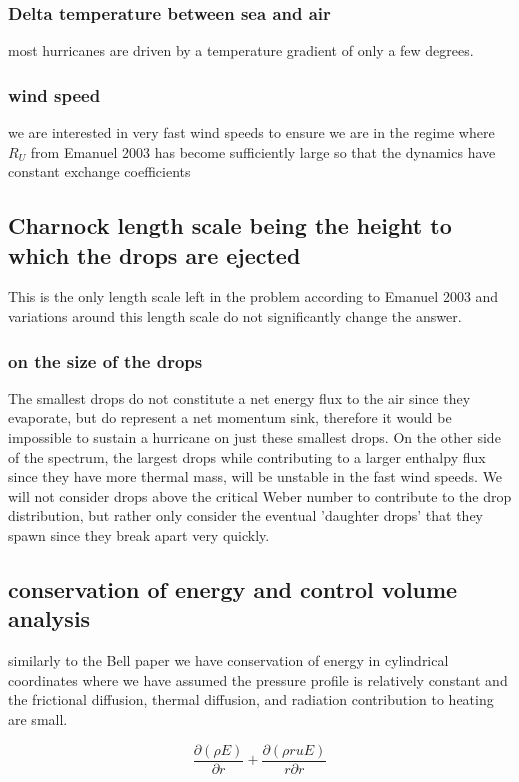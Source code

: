 \documentclass[10pt,a4paper]{article}
\begin{document}
\subsubsection{Delta temperature between sea and air}
most hurricanes are driven by a temperature gradient of only a few degrees. 
\subsubsection{wind speed}
we are interested in very fast wind speeds to ensure we are in the regime where $R_U$ from Emanuel 2003 has become sufficiently large so that the dynamics have constant exchange coefficients 
\subsection{Charnock length scale being the height to which the drops are ejected}
This is the only length scale left in the problem according to Emanuel 2003 and variations around this length scale do not significantly change the answer.


\subsubsection{on the size of the drops}
The smallest drops do not constitute a net energy flux to the air since they evaporate, but do represent a net momentum sink, therefore it would be impossible to sustain a hurricane on just these smallest drops. On the other side of the spectrum, the largest drops while contributing to a larger enthalpy flux since they have more thermal mass, will be unstable in the fast wind speeds. We will not consider drops above the critical Weber number to contribute to the drop distribution, but rather only consider the eventual 'daughter drops' that they spawn since they break apart very quickly. 

\subsection{conservation of energy and control volume analysis}
similarly to the Bell paper we have conservation of energy in cylindrical coordinates where we have assumed the pressure profile is relatively constant and the frictional diffusion, thermal diffusion, and radiation contribution to heating are small.

\[ \frac{\partial (\rho E)}{\partial r} + \frac{\partial (\rho r u E)}{r \partial r}\]
\end{document}
